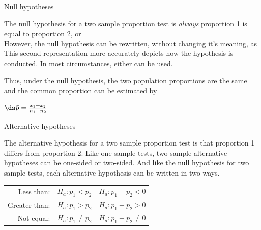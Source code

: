 \documentclass[xcolor=table, aspectratio=169, bigger]{beamer}
\begin{document}
\begin{frame}{Null hypotheses}
\begin{block}{}
The null hypothesis for a two sample proportion test is \emph{always} proportion 1 is equal to proportion 2, or\\
\smallskip
{}
\pause\medskip
However, the null hypothesis can be rewritten, without changing it's meaning, as\\
\smallskip
{}
\pause\medskip
This second representation more accurately depicts how the hypothesis is conducted. In most circumstances, either can be used.
\end{block}
\pause
\begin{block}{}
Thus, under the null hypothesis, the two population proportions are the same and the common proportion can be estimated by\\
\medskip
{\centering
$\ds \bar p = \frac{x_1 + x_2}{n_1 + n_2}$
\par}
\end{block}
\end{frame}

\begin{frame}{Alternative hypotheses}
\begin{block}{}
The alternative hypothesis for a two sample proportion test is that proportion 1 differs from proportion 2. Like one sample tests, two sample alternative hypotheses can be one-sided or two-sided. And like the null hypothesis for two sample tests, each alternative hypothesis can be written in two ways.\\
\smallskip
{\centering 
\begin{tabular}{r c | c}
Less than: & $H_a: p_1 < p_2$ & $H_a: p_1 - p_2 < 0$\\
Greater than: & $H_a: p_1 > p_2$ & $H_a: p_1 - p_2 > 0$\\
Not equal: & $H_a: p_1 \ne p_2$ & $H_a: p_1 - p_2 \ne 0$
\end{tabular}
\par}

\end{block}
\end{frame}
\end{document}
